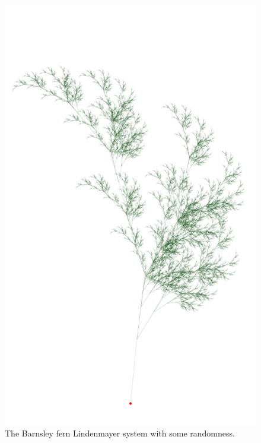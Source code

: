 \documentclass[../notebook.tex]{subfiles}
\begin{document}
\begin{figure}[ht]
  \centering
  \includegraphics{../python-notebooks/lsystem.pdf}
  \caption{The Barnsley fern Lindenmayer system with some randomness.}\label{fig:lsystem}
\end{figure}
\end{document}
